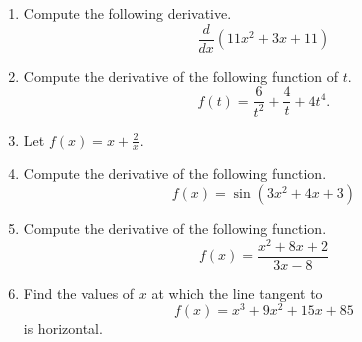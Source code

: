 \documentclass{article}
\begin{document}
\ActivityTitle[class=Calculus I, number=3, name=Differentiation I]

\begin{enumerate}
\item Compute the following derivative. \[ \frac{d}{dx} \left( 11 x^2 + 3 x + 11 \right) \]



  
\vspace{5cm}

\item Compute the derivative of the following function of $t$. \[ f(t) = \frac{6}{t^{2}} + \frac{4}{t} + 4 t^{4}. \]

  
\vspace{5cm}

\item Let $f(x) = x + \frac{2}{x}$.

  
\vspace{5cm}

\item Compute the derivative of the following function. \[ f(x) = \sin(3 x^2 + 4 x + 3) \]

  
\vspace{5cm}

\item Compute the derivative of the following function. \[ f(x) = \frac{x^2 + 8 x + 2}{3 x - 8} \]

  
\vspace{5cm}

\item Find the values of $x$ at which the line tangent to \[ f(x) = x^3 + 9 x^2 + 15 x + 85 \] is horizontal.

  
\vspace{5cm}
\end{enumerate}
\end{document}
